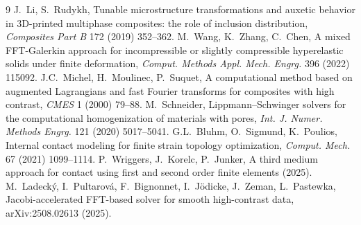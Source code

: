 \documentclass[11pt,a4paper]{article}
\begin{document}
\begin{thebibliography}{9}
 J.~Li, S.~Rudykh, Tunable microstructure transformations and auxetic behavior in 3D-printed
multiphase composites: the role of inclusion distribution, \emph{Composites Part B} 172 (2019) 352--362.
 M.~Wang, K.~Zhang, C.~Chen, A mixed FFT-Galerkin approach for incompressible or slightly
compressible hyperelastic solids under finite deformation, \emph{Comput. Methods Appl. Mech. Engrg.} 396 (2022)
115092.
 J.C.~Michel, H.~Moulinec, P.~Suquet, A computational method based on augmented Lagrangians and
fast Fourier transforms for composites with high contrast, \emph{CMES} 1 (2000) 79--88.
 M.~Schneider, Lippmann--Schwinger solvers for the computational homogenization of materials
with pores, \emph{Int. J. Numer. Methods Engrg.} 121 (2020) 5017--5041.
 G.L.~Bluhm, O.~Sigmund, K.~Poulios, Internal contact modeling for finite strain topology
optimization, \emph{Comput. Mech.} 67 (2021) 1099--1114.
 P.~Wriggers, J.~Kore\-lc, P.~Junker, A third medium approach for contact using first and
second order finite elements (2025).
 M.~Ladeck\'y, I.~Pultarov\'a, F.~Bignonnet, I.~J\"odicke, J.~Zeman, L.~Pastewka,
Jacobi-accelerated FFT-based solver for smooth high-contrast data, arXiv:2508.02613 (2025).
\end{thebibliography}
\end{document}
